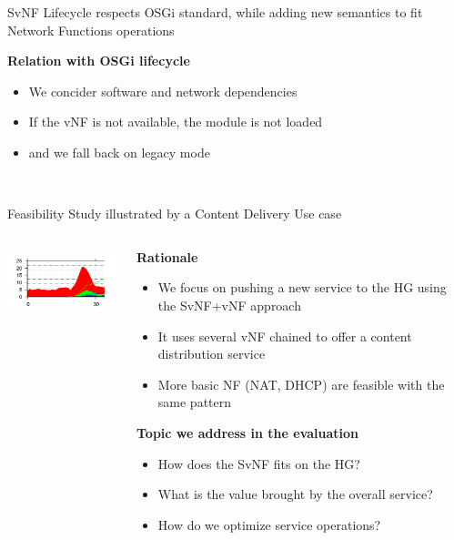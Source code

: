 \documentclass[a4paper]{beamer}
\begin{document}
\begin{frame}{SvNF Lifecycle respects OSGi standard, while adding new semantics to fit Network Functions operations}
	\begin{flushleft}	
		\textbf{Relation with OSGi lifecycle}
		\begin{itemize}
			\item We concider software and network dependencies
			\item If the vNF is not available, the module is not loaded
			\item and we fall back on legacy mode
		\end{itemize}
	\end{flushleft}
	\vspace{2em}
	\centering
	\\
\end{frame}


\begin{frame}{Feasibility Study illustrated by a Content Delivery Use case}
	\begin{columns}[T]
		\begin{column}[T]{0.33 \textwidth} 
			\vspace{1.5cm}
			\includegraphics[width=12em]{results.png}
		\end{column}
										
		\begin{column}[T]{0.66\textwidth} 
										   
			\textbf{Rationale}
			\begin{itemize}
				\item We focus on pushing a new service to the HG using the SvNF+vNF approach
				\item It uses several vNF chained to offer a content distribution service
				\item More basic NF (NAT, DHCP) are feasible with the same pattern
			\end{itemize}
			\vspace{3mm}
			\textbf{Topic we address in the evaluation}
			\begin{itemize}
				\item How does the SvNF fits on the HG?
				\item What is the value brought by the overall service?
				\item How do we optimize service operations?
			\end{itemize}
		\end{column}
																										
	\end{columns}
								
\end{frame}
\end{document}

